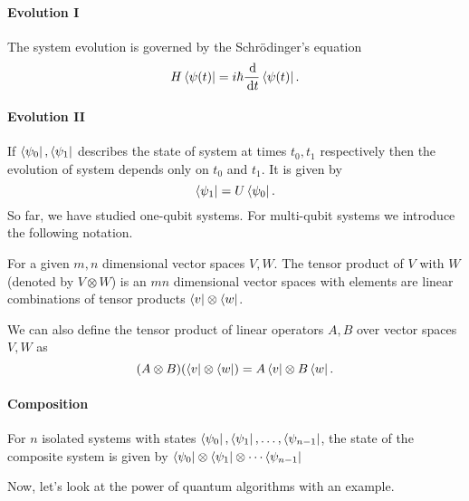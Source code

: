 \paragraph{\textbf{Evolution I}}
The system evolution is governed by the Schrödinger's equation
\[H\bra{\psi(t)}=i\hbar\frac{\, \mathrm{d}}{\, \mathrm{d} t}\bra{\psi(t)}.\]
\paragraph{\textbf{Evolution II}}
If $\bra{\psi_0}, \bra{\psi_1}$ describes the state of system at times $t_0, t_1$ respectively then the evolution of system depends only on $t_0$ and $t_1$. It is given by
\[\bra{\psi_1} = U\bra{\psi_0}.\]
So far, we have studied one-qubit systems. For multi-qubit systems we introduce the following notation.
\begin{definition}
For a given $m,n$ dimensional vector spaces $V,W$. The tensor product of $V$ with $W$ (denoted by $V\otimes W$) is an $mn$ dimensional vector spaces with elements are linear combinations of tensor products $\bra{v}\otimes\bra{w}$.
\end{definition}
We can also define the tensor product of linear operators $A,B$ over vector spaces $V,W$ as
\[(A\otimes B)(\bra{v}\otimes\bra{w})= A\bra{v}\otimes B\bra{w}.\]
\paragraph{\textbf{Composition}}
For $n$ isolated systems with states $\bra{\psi_0}, \bra{\psi_1}, \ldots, \bra{\psi_{n-1}}$, the state of the composite system is given by $\bra{\psi_0}\otimes\bra{\psi_1}\otimes\cdots\bra{\psi_{n-1}}$

Now, let's look at the power of quantum algorithms with an example.